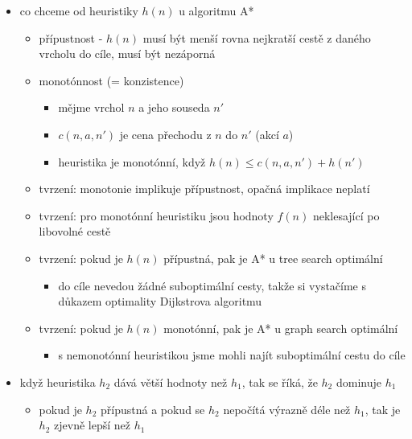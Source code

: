 \begin{itemize}
\begin{itemize}
\begin{itemize}
\item A* algoritmus
\begin{itemize}
\item $f(n)=g(n)+h(n)$, kde $h(n)$ je heuristika
\item optimální a úplný
\item typicky mu dojde paměť dřív než čas
\end{itemize}
\end{itemize}
\item co chceme od heuristiky $h(n)$ u algoritmu A*
\begin{itemize}
\item přípustnost - $h(n)$ musí být menší rovna nejkratší cestě z daného vrcholu do cíle, musí být nezáporná
\item monotónnost (= konzistence)
\begin{itemize}
\item mějme vrchol $n$ a jeho souseda $n'$
\item $c(n,a,n')$ je cena přechodu z $n$ do $n'$ (akcí $a$)
\item heuristika je monotónní, když $h(n)\leq c(n,a,n')+h(n')$
\end{itemize}
\item tvrzení: monotonie implikuje přípustnost, opačná implikace neplatí
\item tvrzení: pro monotónní heuristiku jsou hodnoty $f(n)$ neklesající po libovolné cestě
\item tvrzení: pokud je $h(n)$ přípustná, pak je A* u tree search optimální
\begin{itemize}
\item do cíle nevedou žádné suboptimální cesty, takže si vystačíme s důkazem optimality Dijkstrova algoritmu
\end{itemize}
\item tvrzení: pokud je $h(n)$ monotónní, pak je A* u graph search optimální
\begin{itemize}
\item s nemonotónní heuristikou jsme mohli najít suboptimální cestu do cíle
\end{itemize}
\end{itemize}
\item když heuristika $h_2$ dává větší hodnoty než $h_1$, tak se říká, že $h_2$ dominuje $h_1$
\begin{itemize}
\item pokud je $h_2$ přípustná a pokud se $h_2$ nepočítá výrazně déle než $h_1$, tak je $h_2$ zjevně lepší než $h_1$
\end{itemize}
\end{itemize}
\end{itemize}
